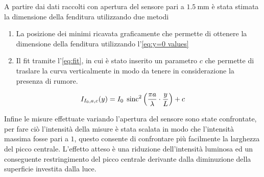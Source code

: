 \documentclass[../main.tex]{subfiles}
\begin{document}
A partire dai dati raccolti con apertura del sensore pari a $\qty{1.5}{\mm}$
è stata stimata la dimensione della fenditura utilizzando due metodi

\begin{enumerate}
    \item La posizione dei minimi ricavata graficamente che permette di ottenere la dimensione della fenditura utilizzando l'\autoref{eq:y=0 values}
    \item Il fit tramite l'\autoref{eq:fit}, in cui è stato inserito un parametro $c$ che permette di traslare la curva verticalmente in modo da tenere in considerazione la presenza di rumore.
\end{enumerate}

\begin{equation} \label{eq:fit}
    I_{I_{0}, a, c}(y) = I_{0} \; \operatorname{sinc}^{2} \left( \frac{\pi a}{\lambda} \cdot \frac{y}{L} \right) + c
\end{equation}

Infine le misure effettuate variando l'apertura del sensore sono state confrontate, per fare ciò l'intensità della misure è stata scalata in modo che l'intensità massima fosse pari a $1$, questo consente di confrontare più facilmente la larghezza del picco centrale. L'effetto atteso è una riduzione dell'intensità luminosa ed un conseguente restringimento del picco centrale derivante dalla diminuzione della superficie investita dalla luce.
\end{document}
